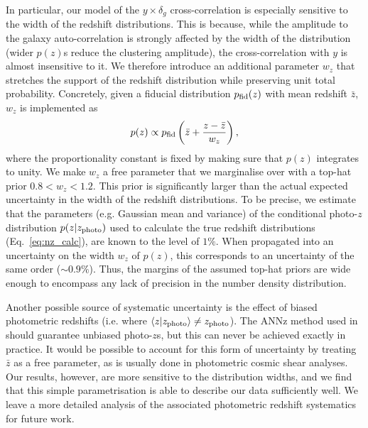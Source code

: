 \documentclass[useAMS,usenatbib]{mn2e}
\begin{document}
      In particular, our model of the $y\times \delta_g$ cross-correlation is especially sensitive to the width of the redshift distributions. This is because, while the amplitude to the galaxy auto-correlation is strongly affected by the width of the distribution (wider $p(z)$s reduce the clustering amplitude), the cross-correlation with $y$ is almost insensitive to it. We therefore introduce an additional parameter $w_z$ that stretches the support of the redshift distribution while preserving unit total probability. Concretely, given a fiducial distribution $p_{\rm fid}(z)$ with mean redshift $\bar{z}$, $w_z$ is implemented as
      \begin{equation}
        p(z)\propto p_{\rm fid}\left(\bar{z}+\frac{z-\bar{z}}{w_z}\right),
      \end{equation}
      where the proportionality constant is fixed by making sure that $p(z)$ integrates to unity. We make $w_z$ a free parameter that we marginalise over with a top-hat prior $0.8<w_z<1.2$. This prior is significantly larger than the actual expected uncertainty in the width of the redshift distributions. To be precise, we estimate that the parameters (e.g. Gaussian mean and variance) of the conditional photo-$z$ distribution $p(z|z_{\rm photo})$ used to calculate the true redshift distributions (Eq.\!~\ref{eq:nz_calc}), are known to the level of $1\%$. When propagated into an uncertainty on the width $w_z$ of $p(z)$, this corresponds to an uncertainty of the same order ($\sim0.9\%$). Thus, the margins of the assumed top-hat priors are wide enough to encompass any lack of precision in the number density distribution.
      
      Another possible source of systematic uncertainty is the effect of biased photometric redshifts (i.e. where $\langle z|z_{\rm photo}\rangle\neq z_{\rm photo}$). The ANNz method used in \cite{2018MNRAS.481.1133P} should guarantee unbiased photo-$z$s, but this can never be achieved exactly in practice. It would be possible to account for this form of uncertainty by treating $\bar{z}$ as a free parameter, as is usually done in photometric cosmic shear analyses. Our results, however, are more sensitive to the distribution widths, and we find that this simple parametrisation is able to describe our data sufficiently well. We leave a more detailed analysis of the associated photometric redshift systematics for future work.
\end{document}
